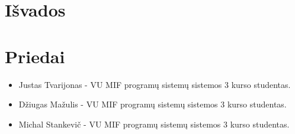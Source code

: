 \documentclass[oneside]{VUMIFPSkursinis}
\begin{document}
\section{Išvados}
\section{Priedai}
	\begin{itemize}
		\item Justas Tvarijonas - VU MIF programų sistemų sistemos 3 kurso studentas.
		\item Džiugas Mažulis - VU MIF programų sistemų sistemos 3 kurso studentas.
		\item Michal Stankevič - VU MIF programų sistemų sistemos 3 kurso studentas.
	\end{itemize}
\end{document}
